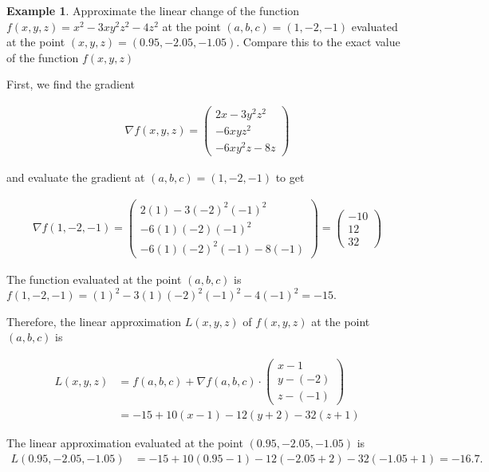 \documentclass[
]{book}
\theoremstyle{definition}
\theoremstyle{definition}
\newtheorem{example}{Example}[chapter]
\theoremstyle{definition}
\theoremstyle{definition}
\theoremstyle{remark}
\begin{document}
\begin{example}

Approximate the linear change of the function \(f(x, y, z) = x^2 - 3xy^2z^2 - 4z^2\) at the point \((a, b, c) = (1, -2, -1)\) evaluated at the point \((x, y, z) = (0.95, -2.05, -1.05)\). Compare this to the exact value of the function \(f(x, y, z)\)

First, we find the gradient

\[
\begin{aligned}
\nabla f(x, y, z) = \begin{pmatrix} 2x - 3y^2z^2 \\ -6xyz^2 \\ -6xy^2z - 8z \end{pmatrix}
\end{aligned}
\]

and evaluate the gradient at \((a, b, c) = (1, -2, -1)\) to get

\[
\begin{aligned}
\nabla f(1, -2, -1) = \begin{pmatrix} 2(1) - 3(-2)^2(-1)^2 \\ -6(1)(-2)(-1)^2 \\ -6(1)(-2)^2(-1) - 8(-1) \end{pmatrix} = \begin{pmatrix} -10 \\ 12 \\ 32 \end{pmatrix} 
\end{aligned}
\]

The function evaluated at the point \((a, b, c)\) is \(f(1, -2, -1) = (1)^2 - 3(1)(-2)^2(-1)^2 - 4(-1)^2 = -15\).

Therefore, the linear approximation \(L(x, y, z)\) of \(f(x, y, z)\) at the point \((a, b, c)\) is

\[
\begin{aligned}
L(x, y, z) & = f(a, b, c) + \nabla f(a, b, c) \cdot \begin{pmatrix} x - 1 \\ y - (-2) \\ z - (-1) \end{pmatrix} \\
& = -15 + 10(x - 1) - 12 (y + 2) - 32 (z + 1)
\end{aligned}
\]

The linear approximation evaluated at the point \((0.95, -2.05, -1.05)\) is
\[
\begin{aligned}
L(0.95, -2.05, -1.05) & = -15 + 10(0.95 - 1) - 12 (-2.05 + 2) - 32 (-1.05 + 1) = -16.7.
\end{aligned}
\]


\end{example}
\end{document}
